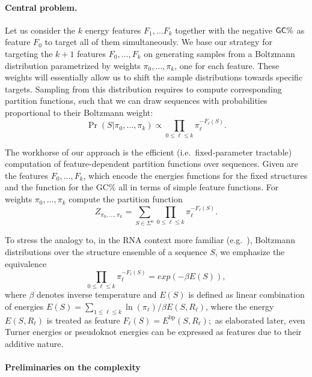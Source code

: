 \documentclass{bmcart}
\newcommand{\partfun}[1]{Z_{#1}}
\newcommand{\EbpSym}{E^{\textrm{bp}}}
\newcommand{\Nuc}[1]{{\sf #1}}
\newcommand{\Cb}{\Nuc{C}}
\newcommand{\Gb}{\Nuc{G}}
\newcommand{\GCb}{\Gb\Cb}
\newcommand{\citep}[1]{\cite{#1}}
\begin{document}
\paragraph{Central problem.}
Let us consider the $k$ energy features $F_1,\dots F_k$ together with the negative $\GCb\%$ as feature $F_0$ to target all of them simultaneously. We base our strategy for targeting the $k+1$ features $F_0,\dots,F_k$ on generating samples from a Boltzmann distribution parametrized by weights $\pi_0,\dots,\pi_k$, one for each feature. These weights will essentially allow us to shift the sample distributions towards specific targets. Sampling from this distribution requires to compute corresponding partition functions, such that we can draw sequences with probabilities proportional to their Boltzmann weight:
\begin{equation}
\label{eq:sample-distribution}
\Pr(S|\pi_0,\dots,\pi_k) \propto \prod_{0\leq \ell\leq k} \pi_\ell^{-F_\ell(S)}.
\end{equation}

The workhorse of our approach is the efficient (i.e.~fixed-parameter tractable) computation of feature-dependent partition functions over sequences.
Given are the features $F_0,\dots,F_k$, which encode the energies functions for the fixed structures and the function for the \GCb\% all in terms of simple feature functions.
For weights $\pi_0,\dots,\pi_k$  compute the partition function
  \begin{equation}
    \label{eq:mainproblem}
    \partfun{\pi_0,\dots,\pi_k} = \sum_{S\in\Sigma^n} \prod_{0\leq \ell\leq k} \pi_\ell^{-F_\ell(S)}.
  \end{equation}

To stress the analogy to, in the RNA context more familiar (e.g.~\citep{McCaskill1990}), Boltzmann distributions over the structure ensemble of a sequence $S$, we emphasize the equivalence
\begin{equation}
\label{eq:feature-energy-transformation}
\prod_{0\leq \ell \leq k} \pi_\ell^{-F_\ell(S)} = exp(-\beta E(S)),
\end{equation}
where $\beta$ denotes inverse temperature and $E(S)$ is defined as linear combination of energies $E(S)=\sum_{1\leq \ell \leq k} \ln(\pi_\ell)/\beta E(S,R_\ell)$,
where the energy $E(S,R_\ell)$ is treated as feature $F_\ell(S) = \EbpSym(S,R_\ell);$ as elaborated later, even Turner energies or pseudoknot energies can be expressed as features due to their additive nature. 

\paragraph{Preliminaries on the complexity} 
\end{document}
